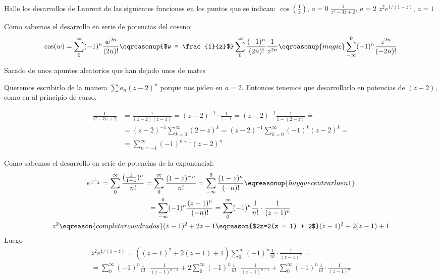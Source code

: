 \begin{problem}[2]
Halle los desarrollos de Laurent de las siguientes funciones en los puntos que se indican:
\ppart $\cos \left(\frac{1}{z}\right)$, $a = 0$
\ppart $\frac{1}{z^2 - 3z + 2}$, $a = 2$
\ppart $z^2 e^{1/(1 - z)}$, $a = 1$

\solution
\spart
{}

Como sabemos el desarrollo en serie de potencias del coseno:
\[ \cos(w) = \sum_0^{\infty} (-1)^n \frac{w^{2n}}{(2n)!} \eqreasonup{$w = \frac{1}{z}$} \sum_0^{\infty} \frac{(-1)^n}{(2n)!} \frac{1}{z^{2n}} \eqreasonup{magic} \sum_{-\infty}^0 (-1)^n \frac{z^{2n}}{(-2n)!} \]

\spart
\textcolor{JungleGreen}{Sacado de unos apuntes aleatorios que han dejado unos de mates}

Queremos escribirlo de la manera $\sum a_n (z-2)^n$ porque nos piden en $a=2$. Entonces tenemos que desarrollarlo en potencias de $(z-2)$, como en al principio de curso.

\begin{align*}
\frac{1}{z^2 - 3z + 2} &= \frac{1}{(z-2)(z-1)} = (z-2)^{-1}·\frac{1}{z-1} = (z-2)^{-1}\frac{1}{1-(2-z)} = \\
 &=(z-2)^{-1} \sum_{k=0}^{∞}(2-z)^k =  (z-2)^{-1} \sum_{k=0}^{∞}(-1)^k(z-2)^k =\\
 &=\sum_{n=-1}^{∞}(-1)^{n+1}(z-2)^n
\end{align*}

\spart
{}

Como sabemos el desarrollo en serie de potencias de la exponencial:
\begin{gather*}
e^{\frac{1}{1-z}} = \sum_{0}^{\infty} \frac{(\frac{1}{1-z})^n}{n!} = \sum_{0}^{\infty} \frac{({1-z})^{-n}}{n!} = \sum_{-\infty}^0 \frac{({1-z})^{n}}{(-n)!} \eqreasonup{hay que centrarla en 1}\\
= \sum_{-\infty}^0 (-1)^n \frac{({z-1})^{n}}{(-n)!} = \sum_0^{\infty} (-1)^n \frac{1}{n!} \cdot \frac{1}{({z-1})^{n}}\\
z^2 \eqreason{completar cuadrados} (z - 1)^2 + 2z - 1 \eqreason{$2z=2(z - 1) + 2$} (z - 1)^2 + 2(z - 1) + 1
\end{gather*}
Luego
\begin{gather*}
z^2 e^{1/(1 - z)} = ((z - 1)^2 + 2(z - 1) + 1) \sum_0^{\infty} (-1)^n \frac{1}{n!} \cdot \frac{1}{({z-1})^{n}} =\\
= \sum_0^{\infty} (-1)^n \frac{1}{n!} \cdot \frac{1}{({z-1})^{n-2}} + 2 \sum_0^{\infty} (-1)^n \frac{1}{n!} \cdot \frac{1}{({z-1})^{n-1}} + \sum_0^{\infty} (-1)^n \frac{1}{n!} \cdot \frac{1}{({z-1})^{n}}
\end{gather*}
\end{problem}

